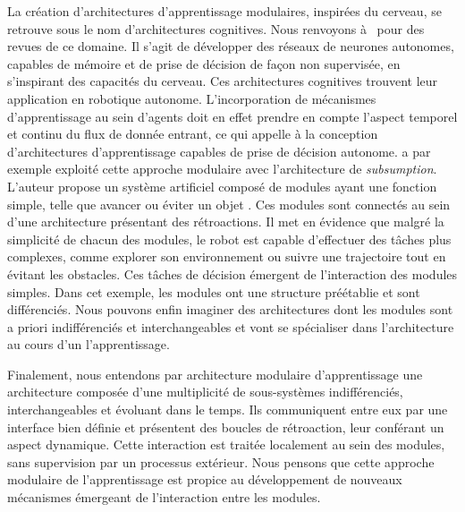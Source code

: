 La création d'architectures d'apprentissage modulaires, inspirées du cerveau, se retrouve sous le nom d'architectures cognitives. Nous renvoyons à~\cite{Thrisson2012CognitiveAA,Kotseruba201840YO} pour des revues de ce domaine. Il s'agit de développer des réseaux de neurones autonomes, capables de mémoire et de prise de décision de façon non supervisée, en s'inspirant des capacités du cerveau.
Ces architectures cognitives trouvent leur application en robotique autonome.
L'incorporation de mécanismes d'apprentissage au sein d'agents doit en effet prendre en compte l'aspect temporel et continu du flux de donnée entrant, ce qui appelle à la conception d'architectures d'apprentissage capables de prise de décision autonome.
\cite{brooks_sumsumption_85} a par exemple exploité cette approche modulaire avec l'architecture de \emph{subsumption}. L'auteur propose un système artificiel composé de modules ayant une fonction simple, telle que \og avancer \fg{} ou \og éviter un objet \fg{}. Ces modules sont connectés au sein d'une architecture présentant des rétroactions. Il met en évidence que malgré la simplicité de chacun des modules, le robot est capable d'effectuer des tâches plus complexes, comme explorer son environnement ou suivre une trajectoire tout en évitant les obstacles. Ces tâches de décision émergent de l'interaction des modules simples.
Dans cet exemple, les modules ont une structure préétablie et sont différenciés. Nous pouvons enfin imaginer des architectures dont les modules sont a priori indifférenciés et interchangeables et vont se spécialiser dans l'architecture au cours d'un l'apprentissage. 


Finalement, nous entendons par architecture modulaire d'apprentissage une architecture composée d'une multiplicité de sous-systèmes indifférenciés, interchangeables et évoluant dans le temps.
Ils communiquent entre eux par une interface bien définie et présentent des boucles de rétroaction, leur conférant un aspect dynamique. Cette interaction est traitée localement au sein des modules, sans supervision par un processus extérieur.
Nous pensons que cette approche modulaire de l'apprentissage est propice au développement de nouveaux mécanismes émergeant de l'interaction entre les modules.

